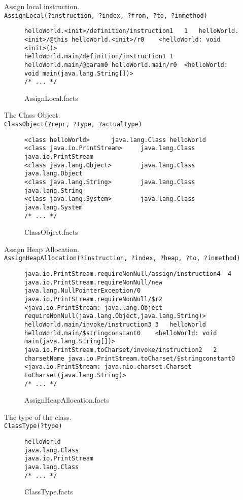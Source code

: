 \documentclass{dithesis}
\begin{document}
        Assign local instruction.\\
        \texttt{AssignLocal(?instruction, ?index, ?from, ?to, ?inmethod)}
        \begin{figure}[H]
\begin{lstlisting}
helloWorld.<init>/definition/instruction1   1   helloWorld.<init>/@this helloWorld.<init>/r0    <helloWorld: void <init>()>
helloWorld.main/definition/instruction1 1   helloWorld.main/@param0 helloWorld.main/r0  <helloWorld: void main(java.lang.String[])>
/* ... */
\end{lstlisting}
\caption{AssignLocal.facts}
        \end{figure}


        The Class Object.\\
        \texttt{ClassObject(?repr, ?type, ?actualtype)}
        \begin{figure}[H]
\begin{lstlisting}
<class helloWorld>      java.lang.Class helloWorld
<class java.io.PrintStream>     java.lang.Class java.io.PrintStream
<class java.lang.Object>        java.lang.Class java.lang.Object
<class java.lang.String>        java.lang.Class java.lang.String
<class java.lang.System>        java.lang.Class java.lang.System
/* ... */
\end{lstlisting}
\caption{ClassObject.facts}
        \end{figure}


        Assign Heap Allocation.\\
        \texttt{AssignHeapAllocation(?instruction, ?index, ?heap, ?to, ?inmethod)}
        \begin{figure}[H]
\begin{lstlisting}
java.io.PrintStream.requireNonNull/assign/instruction4  4   java.io.PrintStream.requireNonNull/new java.lang.NullPointerException/0 java.io.PrintStream.requireNonNull/$r2  <java.io.PrintStream: java.lang.Object requireNonNull(java.lang.Object,java.lang.String)>
helloWorld.main/invoke/instruction3 3   helloWorld  helloWorld.main/$stringconstant0    <helloWorld: void main(java.lang.String[])>
java.io.PrintStream.toCharset/invoke/instruction2   2   charsetName java.io.PrintStream.toCharset/$stringconstant0  <java.io.PrintStream: java.nio.charset.Charset toCharset(java.lang.String)>
/* ... */
\end{lstlisting}
\caption{AssignHeapAllocation.facts}
        \end{figure}


        The type of the class.\\
        \texttt{ClassType(?type)}
        \begin{figure}[H]
\begin{lstlisting}
helloWorld
java.lang.Class
java.io.PrintStream
java.lang.Class
/* ... */
\end{lstlisting}
\caption{ClassType.facts}
        \end{figure}
\end{document}
